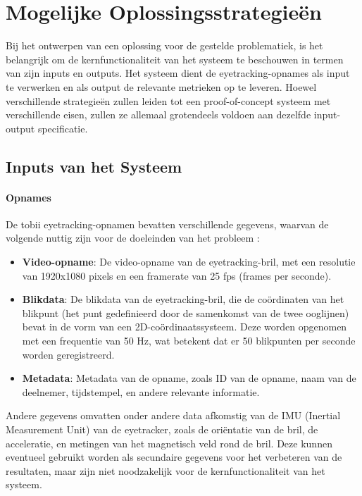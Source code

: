 \chapter{Mogelijke Oplossingsstrategieën}
\label{ch:oplossingsstrategieen}

Bij het ontwerpen van een oplossing voor de gestelde problematiek, is het belangrijk om de 
kernfunctionaliteit van het systeem te beschouwen in termen van zijn inputs en outputs. 
Het systeem dient de eyetracking-opnames als input te verwerken en als output de relevante metrieken op te leveren.
Hoewel verschillende strategieën zullen leiden tot een proof-of-concept systeem met verschillende eisen, 
zullen ze allemaal grotendeels voldoen aan dezelfde input-output specificatie.

\section{Inputs van het Systeem}

\subsubsection{Opnames}

De tobii eyetracking-opnamen bevatten verschillende gegevens, waarvan de volgende nuttig zijn voor de 
doeleinden van het probleem \autocite{Tobii2023}:
\begin{itemize}
    \item \textbf{Video-opname}: De video-opname van de eyetracking-bril, met een resolutie van 1920x1080 pixels en een framerate van 25 fps (frames per seconde).
    \item \textbf{Blikdata}: De blikdata van de eyetracking-bril, die de coördinaten van het blikpunt 
    (het punt gedefinieerd door de samenkomst van de twee ooglijnen) bevat in de vorm van een 2D-coördinaatssysteem.
    Deze worden opgenomen met een frequentie van 50 Hz, wat betekent dat er 50 blikpunten per seconde worden geregistreerd.
    \item \textbf{Metadata}: Metadata van de opname, zoals ID van de opname, naam van de deelnemer, tijdstempel, en andere relevante informatie.
\end{itemize}

Andere gegevens omvatten onder andere data afkomstig van de IMU (Inertial Measurement Unit) van de eyetracker, 
zoals de oriëntatie van de bril, de acceleratie, en metingen van het magnetisch veld rond de bril.
Deze kunnen eventueel gebruikt worden als secundaire gegevens voor het verbeteren van de resultaten, 
maar zijn niet noodzakelijk voor de kernfunctionaliteit van het systeem.

